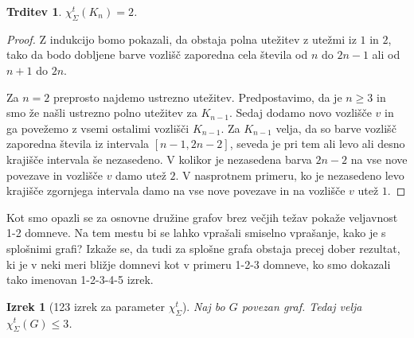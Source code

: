 \documentclass[12pt,a4paper,twoside]{article}
\theoremstyle{definition} %
\theoremstyle{plain} %
\newtheorem{izrek}[definicija]{Izrek}
\newtheorem{trditev}[definicija]{Trditev}
\newcommand{\ect}{\chi_{\Sigma}^t}
\numberwithin{equation}{section}  %
\begin{document}
\begin{trditev}
$\ect(K_n) = 2$.
\end{trditev}

\begin{proof}
Z indukcijo bomo pokazali, da obstaja polna utežitev z utežmi iz $1$ in $2$, tako da bodo dobljene barve vozlišč zaporedna cela števila od $n$ do $2n - 1$ ali od $n+1$ do $2n$. 

Za $n=2$ preprosto najdemo ustrezno utežitev. Predpostavimo, da je $n \ge 3$ in smo že našli ustrezno polno utežitev za $K_{n-1}$. Sedaj dodamo novo vozlišče $v$ in ga povežemo z vsemi ostalimi vozlišči $K_{n-1}$. Za $K_{n-1}$ velja, da so barve vozlišč zaporedna števila iz intervala $[n-1, 2n - 2]$, seveda je pri tem ali levo ali desno krajišče intervala še nezasedeno. V kolikor je nezasedena barva $2n - 2$ na vse nove povezave in vozlišče $v$ damo utež $2$. V nasprotnem primeru, ko je nezasedeno levo krajišče zgornjega intervala damo na vse nove povezave in na vozlišče $v$ utež $1$.
\end{proof}

Kot smo opazli se za osnovne družine grafov brez večjih težav pokaže veljavnost 1-2 domneve. Na tem mestu bi se lahko vprašali smiselno vprašanje, kako je s splošnimi grafi? Izkaže se, da tudi za splošne grafa obstaja precej dober rezultat, ki je v neki meri bližje domnevi kot v primeru 1-2-3 domneve, ko smo dokazali tako imenovan 1-2-3-4-5 izrek.
\begin{izrek}[123 izrek za parameter $\ect$]
\label{theorem123}
Naj bo $G$ povezan graf. Tedaj velja $\ect(G) \le 3$.
 \end{izrek}
\end{document}
